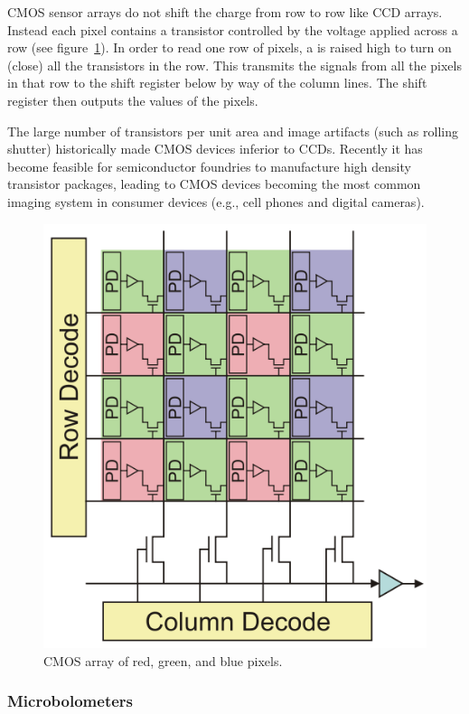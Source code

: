CMOS sensor arrays do not shift the charge from row to row like CCD arrays.
%
Instead each pixel contains a transistor controlled by the voltage applied across a row (see figure~\ref{fig:cmosarray}).
%
In order to read one row of pixels, a  is raised high to turn on (close) all the transistors in the row.
%
This transmits the signals from all the pixels in that row to the shift register below by way of the column lines.
%
The shift register then outputs the values of the pixels.

The large number of transistors per unit area and image artifacts (such as rolling shutter) historically made CMOS devices inferior to CCDs.
%
Recently it has become feasible for semiconductor foundries to manufacture high density transistor packages, leading to CMOS devices becoming the most common imaging system in consumer devices (e.g., cell phones and digital cameras).
\begin{figure}[!htbp]
	\center
	\includegraphics[width=.8\linewidth,keepaspectratio]{figures/background/cmos.png}
	\caption{CMOS array of red, green, and blue pixels.}
	\label{fig:cmosarray}
\end{figure}

\subsubsection{Microbolometers}

